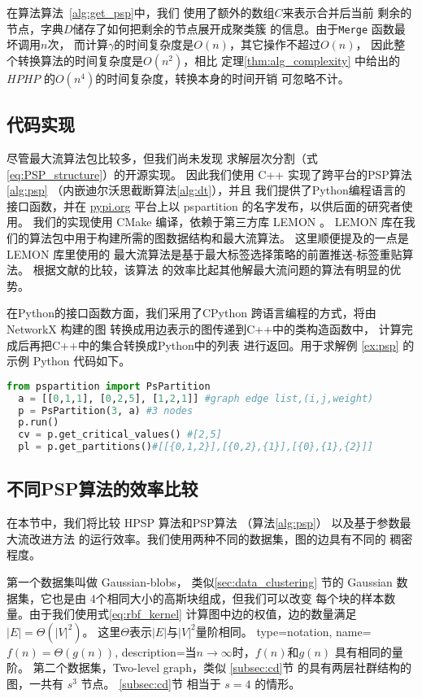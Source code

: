 在算法算法~\ref{alg:get_psp}中，我们
使用了额外的数组$C$来表示合并后当前
剩余的节点，字典$D$储存了如何把剩余的节点展开成聚类簇
的信息。由于\texttt{Merge} 函数最坏调用$n$次，
而计算$\gamma$的时间复杂度是$O(n)$，其它操作不超过$O(n)$，
因此整个转换算法的时间复杂度是$O(n^2)$，相比
定理\ref{thm:alg_complexity}
中给出的$HPHP$ 的$O(n^4)$的时间复杂度，转换本身的时间开销
可忽略不计。

\subsection{代码实现}
尽管最大流算法包比较多，但我们尚未发现
求解层次分割（式\eqref{eq:PSP_structure}）的开源实现。
因此我们使用 C++ 实现了跨平台的PSP算法\ref{alg:psp}
（内嵌迪尔沃思截断算法\ref{alg:dt}），并且
我们提供了Python编程语言的接口函数，并在 \url{pypi.org}
平台上以 pspartition
的名字发布，以供后面的研究者使用。
我们的实现使用 CMake 编译，依赖于第三方库 LEMON \cite{dezsHo2011lemon}。 
LEMON 库在我们的算法包中用于构建所需的图数据结构和最大流算法。
这里顺便提及的一点是 LEMON 库里使用的
最大流算法是基于最大标签选择策略的前置推送-标签重贴算法。
根据文献\citet{ahuja1997computational}的比较，该算法
的效率比起其他解最大流问题的算法有明显的优势。

在Python的接口函数方面，我们采用了CPython
跨语言编程的方式，将由 NetworkX \cite{SciPyProceedings_11} 构建的图
转换成用边表示的图传递到C++中的类构造函数中，
计算完成后再把C++中的集合转换成Python中的列表
进行返回。用于求解例 \ref{ex:psp}
的示例 Python 代码如下。
\begin{lstlisting}[language=Python]
  from pspartition import PsPartition
  a = [[0,1,1], [0,2,5], [1,2,1]] #graph edge list,(i,j,weight)
  p = PsPartition(3, a) #3 nodes
  p.run()
  cv = p.get_critical_values() #[2,5]
  pl = p.get_partitions()#[[{0,1,2}],[{0,2},{1}],[{0},{1},{2}]]
\end{lstlisting}

\subsection{不同PSP算法的效率比较}
在本节中，我们将比较 HPSP 算法和PSP算法
（算法\ref{alg:psp}）
以及基于参数最大流改进方法\cite{kolmogorov}
的运行效率。我们使用两种不同的数据集，图的边具有不同的
稠密程度。

第一个数据集叫做 Gaussian-blobs，
类似\ref{sec:data_clustering}
节的 Gaussian 数据集，它也是由
4个相同大小的高斯块组成，但我们可以改变
每个块的样本数量。由于我们使用式\ref{eq:rbf_kernel}
计算图中边的权值，边的数量满足 $|E|=\Theta(|V|^2)$。
这里$\Theta$表示$|E|$与$|V|^2$量阶相同。
{
  type=notation,
  name={$f(n)=\Theta(g(n))$},
  description={当$n\to \infty$时，$f(n)$和$g(n)$ 具有相同的量阶。}
}
第二个数据集，Two-level graph，类似 \ref{subsec:cd}节
的具有两层社群结构的图，一共有 $s^3$ 节点。
\ref{subsec:cd}节 相当于 $s=4$ 的情形。

